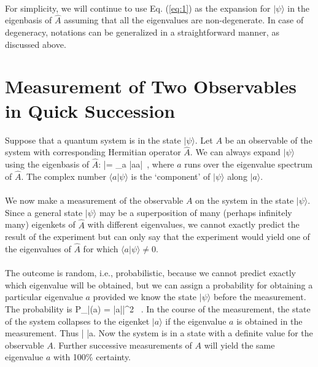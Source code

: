\paragraph{}
For simplicity, we will continue to use Eq. (\ref{eq:1}) as the expansion for $|\psi\rangle$ in the eigenbasis of $\hat{A}$
assuming that all the eigenvalues are non-degenerate. In case of degeneracy, notations can be generalized in a straightforward manner, as discussed above.			



\section{Measurement of Two Observables in Quick Succession}
Suppose that a quantum system is in the state $|\psi\rangle$. Let $A$ be an observable of the system with corresponding Hermitian operator $\hat{A}$. We can always expand $|\psi\rangle$ using the eigenbasis of $\hat{A}$:
\be
|\psi\rangle = \sum_a |a\rangle \langle a|\psi\rangle \, ,
\ee
where $a$ runs over the eigenvalue spectrum of $\hat{A}$. The complex number $\langle a |\psi\rangle$ is the `component' of 
$|\psi\rangle$ along $|a\rangle$. 

\paragraph{}
We now make a measurement of the observable $A$ on the system in the state $|\psi\rangle$. Since a general state $|\psi\rangle$
may be a superposition of many (perhaps infinitely many) eigenkets of $\hat{A}$ with different eigenvalues, we cannot exactly 
predict the result of the experiment but can only say that the experiment would yield one of the eigenvalues 
of $\hat{A}$ for which $\langle a|\psi\rangle \neq 0$. 

\paragraph{}
The outcome is random, i.e., probabilistic, because we cannot predict exactly which eigenvalue will be obtained, but we can assign a probability for obtaining a particular eigenvalue $a$ provided we know the state $|\psi\rangle$ before the measurement.
The probability is
\be
P_{|\psi\rangle}(a) = \left|\langle a|\psi\rangle \right|^2 \, . 
\ee
In the course of the measurement, the state of the system collapses to the eigenket $|a\rangle$ if the eigenvalue $a$ is obtained in the measurement. Thus
\be
|\psi\rangle\;\; \;\; |a\rangle.
\ee
Now the system is in a state with a definite value for the observable $A$. Further successive measurements of $A$ will yield the same eigenvalue $a$ with 100\% certainty. 

